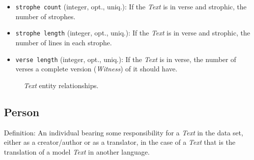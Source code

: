 \begin{itemize}
        \begin{itemize}
            \item \texttt{alliteration}: Rhyme is allowed between words that either start with the same consonant sound or with the same vowel, such as ``\textit{With floures fele, fair under fete}'' in Middle English.\footcite[][396]{Davis2002}
            \item \texttt{assonance}: Rhyme is allowed between words that have a repeated vowel sound, such as ``a'' in ``\textit{Vio puertas abiertas e uços sin cañados / alcandaras vazias sin pielles e sin mantos}'' in Castilian.\footcite[][364]{Gornall1995}
            \item \texttt{end-rhyme}: Rhyme is allowed between words that have an ending that sounds the same, such as ``\textit{ihesu guz son ihesu goþe / bløt mit hiærta mæþ þino bloþe}'' in Old Norse.\footcite[][423]{Layher2008}
            \item \texttt{generic}: ``[R]hyme is allowed between any one member of a phonetic group and is itself or any other member of the same group,'' such as `b,' `g,' `d' in Old Irish.\footcite[][822]{McKie1997}
        \end{itemize}
    \item \texttt{strophe count} (integer, opt., uniq.): If the \textit{Text} is in verse and strophic, the number of strophes.
    \item \texttt{strophe length} (integer, opt., uniq.): If the \textit{Text} is in verse and strophic, the number of lines in each strophe.
    \item \texttt{verse length} (integer, opt., uniq.): If the \textit{Text} is in verse, the number of verses a complete version (\textit{Witness}) of it should have.
\end{itemize}

\begin{figure}[ht]
    \begin{center}
        
    \end{center}
\label{fig:TextER}
\caption{\textit{Text} entity relationships.}
\end{figure}


\subsection{Person}

Definition: An individual bearing some responsibility for a \textit{Text} in the data set, either as a creator/author or as a translator, in the case of a \textit{Text} that is the translation of a model \textit{Text} in another language.

